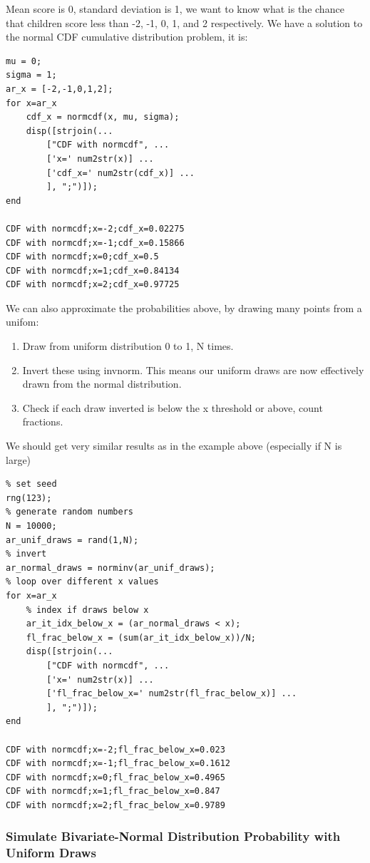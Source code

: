 \documentclass[
]{book}
\begin{document}
Mean score is 0, standard deviation is 1, we want to know what is the
chance that children score less than -2, -1, 0, 1, and 2 respectively.
We have a solution to the normal CDF cumulative distribution problem, it
is:

\begin{verbatim}
mu = 0;
sigma = 1;
ar_x = [-2,-1,0,1,2];
for x=ar_x
    cdf_x = normcdf(x, mu, sigma);
    disp([strjoin(...
        ["CDF with normcdf", ...
        ['x=' num2str(x)] ...
        ['cdf_x=' num2str(cdf_x)] ...
        ], ";")]);
end

CDF with normcdf;x=-2;cdf_x=0.02275
CDF with normcdf;x=-1;cdf_x=0.15866
CDF with normcdf;x=0;cdf_x=0.5
CDF with normcdf;x=1;cdf_x=0.84134
CDF with normcdf;x=2;cdf_x=0.97725
\end{verbatim}

We can also approximate the probabilities above, by drawing many points
from a unifom:

\begin{enumerate}
\def\labelenumi{\arabic{enumi}.}
\item
  Draw from uniform distribution 0 to 1, N times.
\item
  Invert these using invnorm. This means our uniform draws are now
  effectively drawn from the normal distribution.
\item
  Check if each draw inverted is below the x threshold or above, count
  fractions.
\end{enumerate}

We should get very similar results as in the example above (especially
if N is large)

\begin{verbatim}
% set seed
rng(123);
% generate random numbers
N = 10000;
ar_unif_draws = rand(1,N);
% invert
ar_normal_draws = norminv(ar_unif_draws);
% loop over different x values
for x=ar_x
    % index if draws below x
    ar_it_idx_below_x = (ar_normal_draws < x);
    fl_frac_below_x = (sum(ar_it_idx_below_x))/N;
    disp([strjoin(...
        ["CDF with normcdf", ...
        ['x=' num2str(x)] ...
        ['fl_frac_below_x=' num2str(fl_frac_below_x)] ...
        ], ";")]);
end

CDF with normcdf;x=-2;fl_frac_below_x=0.023
CDF with normcdf;x=-1;fl_frac_below_x=0.1612
CDF with normcdf;x=0;fl_frac_below_x=0.4965
CDF with normcdf;x=1;fl_frac_below_x=0.847
CDF with normcdf;x=2;fl_frac_below_x=0.9789
\end{verbatim}

\hypertarget{simulate-bivariate-normal-distribution-probability-with-uniform-draws}{%
\subsubsection{Simulate Bivariate-Normal Distribution Probability with Uniform Draws}\label{simulate-bivariate-normal-distribution-probability-with-uniform-draws}}
\end{document}
